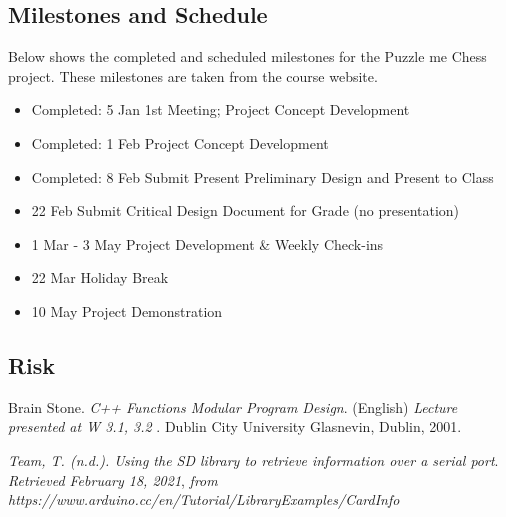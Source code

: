 \documentclass[11pt]{article}
\begin{document}
\subsection{Milestones and Schedule}
Below shows the completed and scheduled milestones for the Puzzle me Chess project. These milestones are taken from the course website.  
\begin{itemize}
\item Completed: 5 Jan	1st Meeting; Project Concept Development
\item Completed: 1  Feb	Project Concept Development 
\item Completed: 8 Feb	Submit Present Preliminary Design and Present to Class
\item 22 Feb	Submit Critical Design Document for Grade (no presentation)
\item 1 Mar - 3 May	Project Development \& Weekly Check-ins
\item 22 Mar	Holiday Break
\item 10 May	Project Demonstration
\end{itemize}

\subsection{Risk}


\begin{thebibliography}{2}
Brain Stone. 
\textit{C++ Functions Modular Program Design}. (English) 
\textit{ Lecture presented at W 3.1, 3.2 }. 
Dublin City University Glasnevin, Dublin, 2001.

\textit{Team, T. (n.d.). Using the SD library to retrieve information over a serial port}.
\textit{ Retrieved February 18, 2021}, 
\textit{from https://www.arduino.cc/en/Tutorial/LibraryExamples/CardInfo}

\end{thebibliography}
\end{document}
